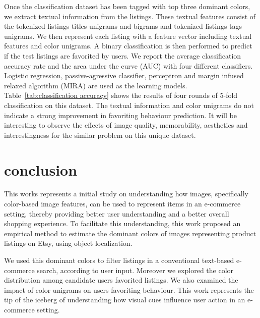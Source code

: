 \documentclass[conference,a4paper]{IEEEtran}
\begin{document}
Once the classification dataset has been tagged with top three
dominant colors, we extract textual information from the
listings. These textual features consist of the tokenized listings
titles unigrams and bigrams and tokenized listings
tags unigrams. We then represent each listing with a feature vector including textual features
and color unigrams. A binary classification is then performed to
predict if the test listings are favorited by
users. We report the average classification accuracy rate and the area
under the curve (AUC) with four different classifiers. Logistic
regression, passive-agressive classifier, perceptron and margin
infused relaxed algorithm (MIRA) are used as the learning models.
Table~\ref{tab:classification accuracy} shows the results
of four rounds of 5-fold classification on this dataset. 
The textual information and color unigrams do not indicate a strong
improvement in favoriting behaviour prediction. It will be interesting
to observe the effects of image quality, memorability, aesthetics and
interestingness for the similar problem on this unique dataset.

\section{conclusion}
\label{sec:conclusion}
This works represents a initial study on understanding how images,
specifically color-based image features, can be used to represent
items in an e-commerce setting, thereby providing better user
understanding and a better overall shopping experience. To facilitate
this understanding, this work proposed an  empirical method to
estimate the dominant colors of images representing product listings
on Etsy, using object localization. 

We used this dominant colors to filter listings in a conventional text-based e-commerce search, according to user input. Moreover we explored the color distribution among candidate users favorited listings. We also examined the impact of color unigrams on users favoriting behaviour. This work represents the tip of the iceberg of understanding how visual cues influence user action in an e-commerce setting. 



%

\end{document}
